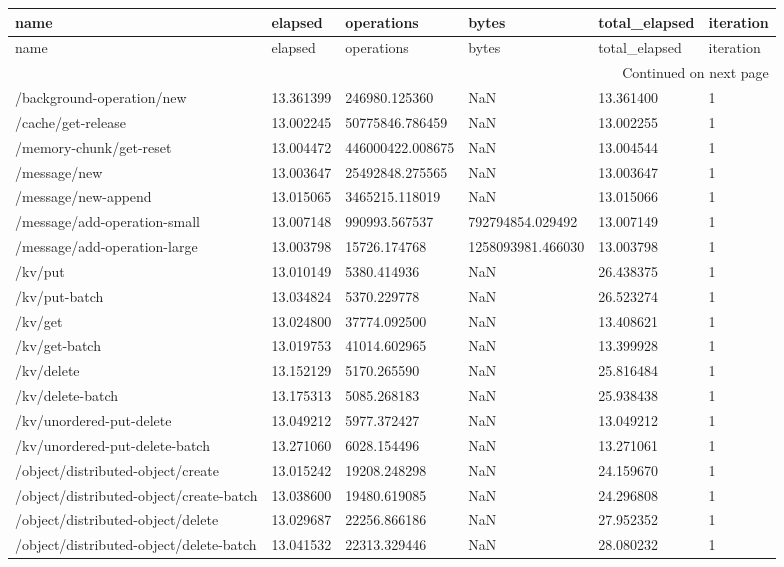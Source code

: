 \begin{tabularx}{\linewidth}{XXXXXX}
\toprule
name & elapsed & operations & bytes & total\_elapsed & iteration \\
\midrule
\endfirsthead
\toprule
name & elapsed & operations & bytes & total\_elapsed & iteration \\
\midrule
\endhead
\midrule
\multicolumn{6}{r}{Continued on next page} \\
\midrule
\endfoot
\bottomrule
\endlastfoot
/background-operation/new & 13.361399 & 246980.125360 & NaN & 13.361400 & 1 \\
/cache/get-release & 13.002245 & 50775846.786459 & NaN & 13.002255 & 1 \\
/memory-chunk/get-reset & 13.004472 & 446000422.008675 & NaN & 13.004544 & 1 \\
/message/new & 13.003647 & 25492848.275565 & NaN & 13.003647 & 1 \\
/message/new-append & 13.015065 & 3465215.118019 & NaN & 13.015066 & 1 \\
/message/add-operation-small & 13.007148 & 990993.567537 & 792794854.029492 & 13.007149 & 1 \\
/message/add-operation-large & 13.003798 & 15726.174768 & 1258093981.466030 & 13.003798 & 1 \\
/kv/put & 13.010149 & 5380.414936 & NaN & 26.438375 & 1 \\
/kv/put-batch & 13.034824 & 5370.229778 & NaN & 26.523274 & 1 \\
/kv/get & 13.024800 & 37774.092500 & NaN & 13.408621 & 1 \\
/kv/get-batch & 13.019753 & 41014.602965 & NaN & 13.399928 & 1 \\
/kv/delete & 13.152129 & 5170.265590 & NaN & 25.816484 & 1 \\
/kv/delete-batch & 13.175313 & 5085.268183 & NaN & 25.938438 & 1 \\
/kv/unordered-put-delete & 13.049212 & 5977.372427 & NaN & 13.049212 & 1 \\
/kv/unordered-put-delete-batch & 13.271060 & 6028.154496 & NaN & 13.271061 & 1 \\
/object/distributed-object/create & 13.015242 & 19208.248298 & NaN & 24.159670 & 1 \\
/object/distributed-object/create-batch & 13.038600 & 19480.619085 & NaN & 24.296808 & 1 \\
/object/distributed-object/delete & 13.029687 & 22256.866186 & NaN & 27.952352 & 1 \\
/object/distributed-object/delete-batch & 13.041532 & 22313.329446 & NaN & 28.080232 & 1 \\

\end{tabularx}
